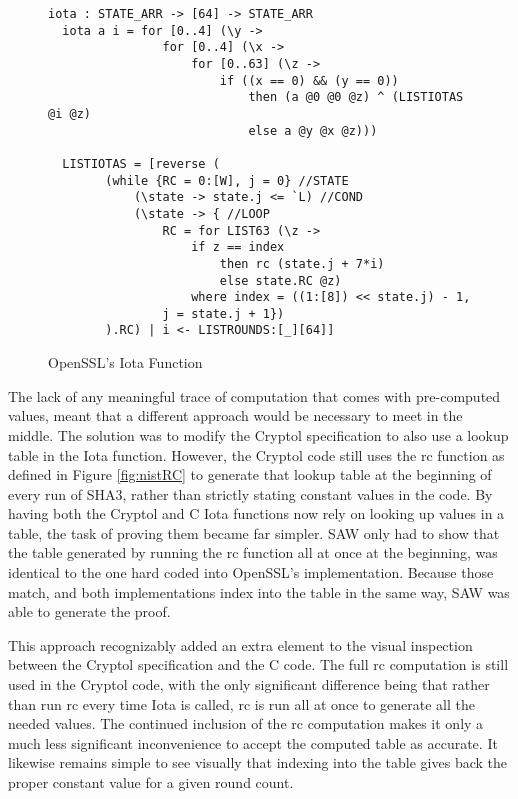 \begin{figure}[t]
  \centering
\begin{lstlisting}[language=Cryptol]
  iota : STATE_ARR -> [64] -> STATE_ARR
  iota a i = for [0..4] (\y ->
                for [0..4] (\x ->
                    for [0..63] (\z ->
                        if ((x == 0) && (y == 0))
                            then (a @0 @0 @z) ^ (LISTIOTAS @i @z)
	                        else a @y @x @z)))

  LISTIOTAS = [reverse (
        (while {RC = 0:[W], j = 0} //STATE
            (\state -> state.j <= `L) //COND
            (\state -> { //LOOP
                RC = for LIST63 (\z ->
                    if z == index
                        then rc (state.j + 7*i)
                        else state.RC @z)
                    where index = ((1:[8]) << state.j) - 1,
                j = state.j + 1})
        ).RC) | i <- LISTROUNDS:[_][64]]
\end{lstlisting}
\caption{OpenSSL's Iota Function}
\label{fig:cryptolIota}
\end{figure}

The lack of any meaningful trace of computation that comes with pre-computed values, meant that a different approach would be necessary to meet in the middle.
The solution was to modify the Cryptol specification to also use a lookup table in the Iota function.
However, the Cryptol code still uses the rc function as defined in Figure \ref{fig:nistRC} to generate that lookup table at the beginning of every run of SHA3, rather than strictly stating constant values in the code.
By having both the Cryptol and C Iota functions now rely on looking up values in a table, the task of proving them became far simpler.
SAW only had to show that the table generated by running the rc function all at once at the beginning, was identical to the one hard coded into OpenSSL's implementation.
Because those match, and both implementations index into the table in the same way, SAW was able to generate the proof.

This approach recognizably added an extra element to the visual inspection between the Cryptol specification and the C code.
The full rc computation is still used in the Cryptol code, with the only significant difference being that rather than run rc every time Iota is called, rc is run all at once to generate all the needed values.
The continued inclusion of the rc computation makes it only a much less significant inconvenience to accept the computed table as accurate. 
It likewise remains simple to see visually that indexing into the table gives back the proper constant value for a given round count.

